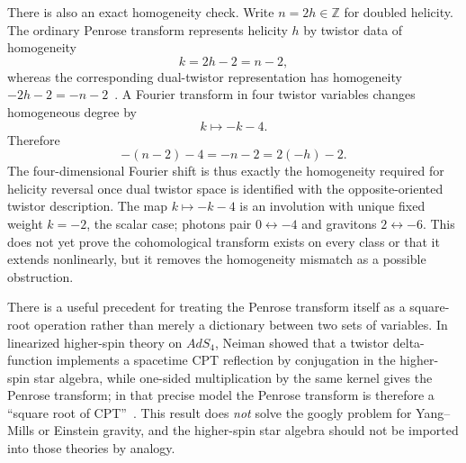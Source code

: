 \documentclass[11pt]{article}
\theoremstyle{definition}\newtheorem{definition}[theorem]{Definition}
\theoremstyle{remark}\newtheorem{remark}[theorem]{Remark}\newtheorem{conjecture}[theorem]{Conjecture}
\begin{document}
There is also an exact homogeneity check. Write $n=2h\in\mathbb Z$ for doubled helicity. The ordinary Penrose transform represents helicity $h$ by twistor data of homogeneity
\begin{equation}\label{eq:twistorweight}
 k=2h-2=n-2,
\end{equation}
whereas the corresponding dual-twistor representation has homogeneity $-2h-2=-n-2$~\cite{WardWells,ArkaniHamed2010}. A Fourier transform in four twistor variables changes homogeneous degree by
\begin{equation}\label{eq:fourierweight}
 k\longmapsto -k-4.
\end{equation}
Therefore
\begin{equation}\label{eq:weightflip}
 -(n-2)-4=-n-2=2(-h)-2.
\end{equation}
The four-dimensional Fourier shift is thus exactly the homogeneity required for helicity reversal once dual twistor space is identified with the opposite-oriented twistor description. The map $k\mapsto-k-4$ is an involution with unique fixed weight $k=-2$, the scalar case; photons pair $0\leftrightarrow-4$ and gravitons $2\leftrightarrow-6$. This does not yet prove the cohomological transform exists on every class or that it extends nonlinearly, but it removes the homogeneity mismatch as a possible obstruction.

There is a useful precedent for treating the Penrose transform itself as a square-root operation rather than merely a dictionary between two sets of variables. In linearized higher-spin theory on $AdS_4$, Neiman showed that a twistor delta-function implements a spacetime CPT reflection by conjugation in the higher-spin star algebra, while one-sided multiplication by the same kernel gives the Penrose transform; in that precise model the Penrose transform is therefore a ``square root of CPT''~\cite{Neiman2017}. This result does \emph{not} solve the googly problem for Yang--Mills or Einstein gravity, and the higher-spin star algebra should not be imported into those theories by analogy.
\end{document}
